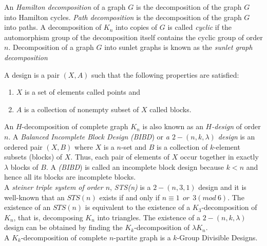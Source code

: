 \documentclass[12pt]{report}
\newcommand{\ben}{\begin{enumerate}}
\newcommand{\een}{\end{enumerate}}
\begin{document}

An {\em Hamilton decomposition} of a graph $G$ is the decomposition
of the graph $G$ into Hamilton cycles. {\em Path decomposition} is
the decomposition of the graph $G$ into paths. A decomposition of
$K_n$ into copies of $G$ is called {\em cyclic} if the automorphism
group of the decomposition itself contains the cyclic group of order
$n$. Decomposition of a graph $G$ into sunlet graphs is known as the
{\em sunlet graph decomposition}

A design is a pair $(X,A)$ such that the following properties are
satisfied: \ben \item $X$ is a set of elements called points and
\item $A$ is a collection of nonempty subset of $X$ called blocks.
\een An $H$-decomposition of complete graph $K_n$ is also known as
an {\em $H$-design} of order $n$. A {\em Balanced Incomplete Block
Design} {\em (BIBD}) or {\em a $2-(n,k,\lambda)$ design} is an
ordered pair $(X,B)$ where $X$ is a $n$-set and $B$ is a collection
of $k$-element subsets (blocks) of $X$. Thus, each pair of elements
of $X$  occur together in exactly $\lambda$ blocks of $B$. A {\em
(BIBD}) is called an incomplete block design because $k<n$ and hence
all its blocks are incomplete blocks. \\A {\em steiner triple system
of order $n$}, {\em STS(n)} is a $2-(n,3,1)$ design and it is
well-known that an $STS(n)$ exists if and only if $n\equiv 1\ \ or\
\ 3(mod\ 6)$. The existence of an $STS(n)$ is equivalent to the
existence of a $K_3$-decomposition of $K_n$, that is, decomposing
$K_n$ into triangles. The existence of a $2-(n,k,\lambda)$ design
can be obtained by finding the
$K_k$-decomposition of $\lambda K_n$.\\
A $K_k$-decomposition of complete $n$-partite graph is a $k$-Group
Divisible Designs.
\end{document}
